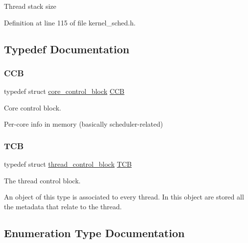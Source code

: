 Thread stack size 

Definition at line 115 of file kernel\+\_\+sched.\+h.



\subsection{Typedef Documentation}
\mbox{\label{group__scheduler_ga7485b31e0dd9fd723bc2d75fba5206a0}} 
\subsubsection{\texorpdfstring{C\+CB}{CCB}}
{\footnotesize\ttfamily typedef struct \hyperlink{structcore__control__block}{core\+\_\+control\+\_\+block}  \hyperlink{group__scheduler_ga7485b31e0dd9fd723bc2d75fba5206a0}{C\+CB}}



Core control block. 

Per-\/core info in memory (basically scheduler-\/related) \mbox{\label{group__scheduler_gaf88d9c946bf70b36a1e8bc34383abfc9}} 
\subsubsection{\texorpdfstring{T\+CB}{TCB}}
{\footnotesize\ttfamily typedef struct \hyperlink{structthread__control__block}{thread\+\_\+control\+\_\+block}  \hyperlink{group__scheduler_gaf88d9c946bf70b36a1e8bc34383abfc9}{T\+CB}}



The thread control block. 

An object of this type is associated to every thread. In this object are stored all the metadata that relate to the thread. 

\subsection{Enumeration Type Documentation}
\mbox{\label{group__scheduler_gaad787d8d80312ffca3c0f197b3a25fbe}} 

